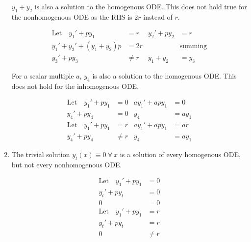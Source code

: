 \begin{enumerate}
          $ y_{1} + y_{2} $ is also a solution to the homogenous ODE. This does not
          hold true for the nonhomogenous ODE as the RHS is $ 2r $ instead of $ r $.

          \begin{align}
              \text{Let} \quad y_{1}' + py_{1}   & = r            &
              y_{2}' + py_{2}                    & = r              \\
              y_{1}' + y_{2}' + (y_{1} + y_{2})p & = 2r           &
                                                 & \text{summing}   \\
              y_{3}' + py_{3}                    & \neq r         &
              y_{1} + y_{2}                      & = y_{3}
          \end{align}


          For a scalar multiple $ a $, $ y_{4} $ is also a solution to the homogenous
          ODE. This does not hold for the inhomogenous ODE.

          \begin{align}
              \text{Let} \quad y_{1}' + py_{1} & = 0      &
              ay_{1}' + apy_{1}                & = 0        \\
              y_{4}' + py_{4}                  & = 0      &
              y_{4}                            & = ay_{1}   \\
              \text{Let} \quad y_{1}' + py_{1} & = r      &
              ay_{1}' + apy_{1}                & = ar       \\
              y_{4}' + py_{4}                  & \neq r   &
              y_{4}                            & = ay_{1}
          \end{align}


    \item The trivial solution $ y_{t}(x) \equiv 0\ \forall\ x$ is a solution of every homogenous
          ODE, but not every nonhomogenous ODE.

          \begin{align}
              \text{Let} \quad y_{1}' + py_{1} & = 0    \\
              y_{t}' + py_{t}                  & = 0    \\
              0                                & = 0    \\
              \text{Let} \quad y_{1}' + py_{1} & = r    \\
              y_{t}' + py_{t}                  & = r    \\
              0                                & \neq r
          \end{align}



\end{enumerate}
